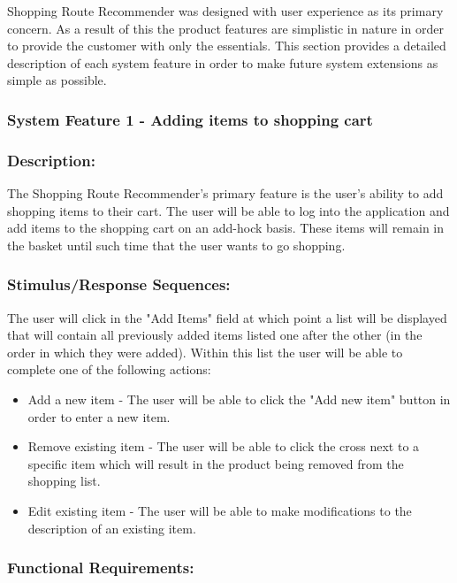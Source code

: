 \documentclass[10pt,twocolumn]{witseiepaper}
\begin{document}
		Shopping Route Recommender was designed with user experience as its primary concern. As a result of this the product features are simplistic in nature in order to provide the customer with only the essentials.	This section provides a detailed description of each system feature in order to make future system extensions as simple as possible. 
		
		\subsubsection{System Feature 1 - Adding items to shopping cart}
		\label{featureadd}
		
		\subsubsection*{Description:}
		
		The Shopping Route Recommender's primary feature is the user's ability to add shopping items to their cart. The user will be able to log into the application and add items to the shopping cart on an add-hock basis. These items will remain in the basket until such time that the user wants to go shopping. 
		
		\subsubsection*{Stimulus/Response Sequences:}
		
		The user will click in the "Add Items" field at which point a list will be displayed that will contain all previously added items listed one after the other (in the order in which they were added). Within this list the user will be able to complete one of the following actions:
		
		\begin{itemize}
			\item Add a new item - The user will be able to click the "Add new item" button in order to enter a new item. 
			\item Remove existing item - The user will be able to click the cross next to a specific item which will result in the product being removed from the shopping list.
			\item Edit existing item - The user will be able to make modifications to the description of an existing item.
		\end{itemize}
		
		\subsubsection*{Functional Requirements:}
		
\end{document}
